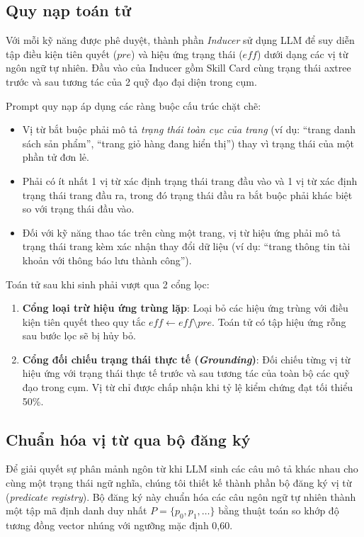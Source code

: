 \subsection{Quy nạp toán tử}

Với mỗi kỹ năng được phê duyệt, thành phần \textit{Inducer} sử dụng LLM để suy diễn tập điều kiện tiên quyết ($\mathit{pre}$) và hiệu ứng trạng thái ($\mathit{eff}$) dưới dạng các vị từ ngôn ngữ tự nhiên. Đầu vào của Inducer gồm Skill Card cùng trạng thái axtree trước và sau tương tác của 2 quỹ đạo đại diện trong cụm.

Prompt quy nạp áp dụng các ràng buộc cấu trúc chặt chẽ:
\begin{itemize}
  \item Vị từ bắt buộc phải mô tả \textit{trạng thái toàn cục của trang} (ví dụ: ``trang danh sách sản phẩm'', ``trang giỏ hàng đang hiển thị'') thay vì trạng thái của một phần tử đơn lẻ.
  \item Phải có ít nhất 1 vị từ xác định trạng thái trang đầu vào và 1 vị từ xác định trạng thái trang đầu ra, trong đó trạng thái đầu ra bắt buộc phải khác biệt so với trạng thái đầu vào.
  \item Đối với kỹ năng thao tác trên cùng một trang, vị từ hiệu ứng phải mô tả trạng thái trang kèm xác nhận thay đổi dữ liệu (ví dụ: ``trang thông tin tài khoản với thông báo lưu thành công'').
\end{itemize}

Toán tử sau khi sinh phải vượt qua 2 cổng lọc:
\begin{enumerate}
  \item \textbf{Cổng loại trừ hiệu ứng trùng lặp}: Loại bỏ các hiệu ứng trùng với điều kiện tiên quyết theo quy tắc $\mathit{eff} \leftarrow \mathit{eff} \setminus \mathit{pre}$. Toán tử có tập hiệu ứng rỗng sau bước lọc sẽ bị hủy bỏ.
  \item \textbf{Cổng đối chiếu trạng thái thực tế (\textit{Grounding})}: Đối chiếu từng vị từ hiệu ứng với trạng thái thực tế trước và sau tương tác của toàn bộ các quỹ đạo trong cụm. Vị từ chỉ được chấp nhận khi tỷ lệ kiểm chứng đạt tối thiểu 50\%.
\end{enumerate}

\subsection{Chuẩn hóa vị từ qua bộ đăng ký}

Để giải quyết sự phân mảnh ngôn từ khi LLM sinh các câu mô tả khác nhau cho cùng một trạng thái ngữ nghĩa, chúng tôi thiết kế thành phần bộ đăng ký vị từ (\textit{predicate registry}). Bộ đăng ký này chuẩn hóa các câu ngôn ngữ tự nhiên thành một tập mã định danh duy nhất $P = \{p_0, p_1, \dots\}$ bằng thuật toán so khớp độ tương đồng vector nhúng với ngưỡng mặc định 0,60.

